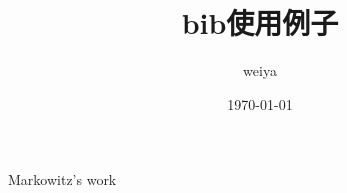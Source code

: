 \documentclass[a4paper,left=2.6cm,right=2.6cm,12pt]{article}
\title{bib使用例子}
\author{weiya}
\date{\today}
\begin{document}
	\maketitle
Markowitz's work\cite{markowitz1952portfolio}
\printbibliography
\end{document}
